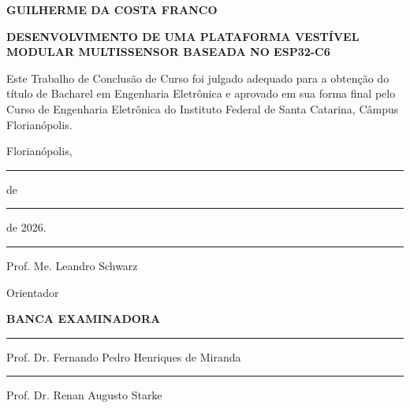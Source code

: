 \documentclass[a4paper,12pt]{article}
\begin{document}
\clearpage
\thispagestyle{empty}
\vspace*{\fill}
\begin{center}
\end{center}
\vspace*{\fill}
\clearpage

\begin{titlepage}
\thispagestyle{empty}
\begin{center}
{\bfseries GUILHERME DA COSTA FRANCO\par}

\vspace{2cm}

{\bfseries DESENVOLVIMENTO DE UMA PLATAFORMA VESTÍVEL MODULAR
MULTISSENSOR BASEADA NO ESP32-C6\par}
\end{center}

\vspace{2cm}

\justifying
Este Trabalho de Conclusão de Curso foi julgado adequado para a
obtenção do título de Bacharel em Engenharia Eletrônica e aprovado em
sua forma final pelo Curso de Engenharia Eletrônica do Instituto
Federal de Santa Catarina, Câmpus Florianópolis.

\vspace{1.2cm}

\begin{center}
Florianópolis, \rule{1cm}{0.4pt} de \rule{3cm}{0.4pt} de 2026.

\vspace{1.5cm}

\rule{8cm}{0.4pt}\par
\vspace{0.2cm}
Prof. Me. Leandro Schwarz\par
Orientador\par

\vspace{1.5cm}

\textbf{BANCA EXAMINADORA}

\vspace{1.2cm}

\rule{8cm}{0.4pt}\par
\vspace{0.2cm}
Prof. Dr. Fernando Pedro Henriques de Miranda\par

\vspace{1.2cm}

\rule{8cm}{0.4pt}\par
\vspace{0.2cm}
Prof. Dr. Renan Augusto Starke\par
\end{center}
\end{titlepage}
\end{document}
